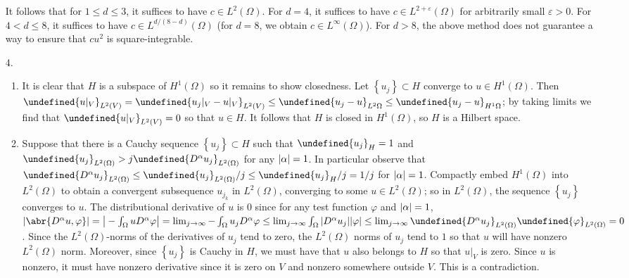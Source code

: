 \documentclass[11pt,leqno]{article}
\theoremstyle{plain}
\theoremstyle{definition}
\numberwithin{equation}{section}
\numberwithin{lem}{section}
\newcommand{\cbr}[1]{\left\{#1\right\}}
\let\norm\undefined %
\DeclarePairedDelimiter\norm{\lVert}{\rVert}
\begin{document}
\begin{enumerate}
    It follows that for $1\leq d\leq 3$, it suffices to have $c\in L^2(\Omega)$. For $d = 4$, it suffices to have $c\in L^{2+\varepsilon}(\Omega)$ for arbitrarily small $\varepsilon>0$. For $4<d\leq 8$, it suffices to have $c\in L^{d/(8-d)}(\Omega)$ (for $d=8$, we obtain $c\in L^\infty(\Omega)$). For $d>8$, the above method does not guarantee a way to ensure that $cu^2$ is square-integrable.
    \item[4.] \begin{enumerate}
      \item It is clear that $H$ is a subspace of $H^1(\Omega)$ so it remains to show closedness. Let $\cbr{u_j}\subset H$ converge to $u\in H^1(\Omega)$. Then $\norm{u|_V}_{L^2(V)} = \norm{u_j|_V-u|_V}_{L^2(V)}\leq \norm{u_j-u}_{L^2{\Omega}}\leq \norm{u_j-u}_{H^1{\Omega}}$; by taking limits we find that $\norm{u|_V}_{L^2(V)} = 0$ so that $u\in H$. It follows that $H$ is closed in $H^1(\Omega)$, so $H$ is a Hilbert space.
      \item Suppose that there is a Cauchy sequence $\cbr{u_j}\subset H$ such that $\norm{u_j}_H = 1$ and $\norm{u_j}_{L^2(\Omega)}> j\norm{D^\alpha u_j}_{L^2(\Omega)}$ for any $\abs{\alpha} = 1$. In particular observe that $\norm{D^\alpha u_j}_{L^2(\Omega)}\leq \norm{u_j}_{L^2(\Omega)}/j\leq \norm{u_j}_H/j = 1/j$ for $\abs{\alpha} = 1$. Compactly embed $H^1(\Omega)$ into $L^2(\Omega)$ to obtain a convergent subsequence $u_{j_k}$ in $L^2(\Omega)$, converging to some $u\in L^2(\Omega)$; so in $L^2(\Omega)$, the sequence $\cbr{u_j}$ converges to $u$. The distributional derivative of $u$ is $0$ since for any test function $\varphi$ and $\abs{\alpha} = 1$, $|\abr{D^\alpha u,\varphi}| = \big|-\int_\Omega u D^\alpha \varphi\big| = \lim_{j\to\infty}-\int_\Omega u_jD^\alpha \varphi \leq \lim_{j \to\infty}\int_\Omega \abs{D^\alpha u_j}\abs{\varphi} \leq \lim_{j\to\infty}\norm{D^\alpha u_j}_{L^2(\Omega)}\norm{\varphi}_{L^2(\Omega)} = 0$. Since the $L^2(\Omega)$-norms of the derivatives of $u_j$ tend to zero, the $L^2(\Omega)$ norms of $u_j$ tend to $1$ so that $u$ will have nonzero $L^2(\Omega)$ norm. Moreover, since $\cbr{u_j}$ is Cauchy in $H$, we must have that $u$ also belongs to $H$ so that $u|_V$ is zero. Since $u$ is nonzero, it must have nonzero derivative since it is zero on $V$ and nonzero somewhere outside $V$. This is a contradiction.
    \end{enumerate}
\end{enumerate}
\end{document}
